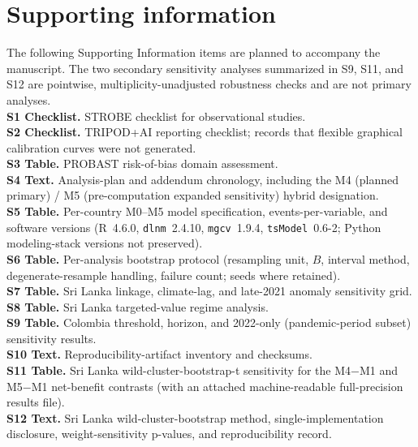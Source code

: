 \documentclass[11pt,a4paper]{article}
\begin{document}
\clearpage
\section*{Supporting information}
\begingroup{}
\noindent The following Supporting Information items are planned to accompany the manuscript. The two secondary sensitivity analyses summarized in S9, S11, and S12 are pointwise, multiplicity-unadjusted robustness checks and are not primary analyses.\\[0.4em]
\noindent\textbf{S1 Checklist.} STROBE checklist for observational studies.\\
\textbf{S2 Checklist.} TRIPOD+AI reporting checklist; records that flexible graphical calibration curves were not generated.\\
\textbf{S3 Table.} PROBAST risk-of-bias domain assessment.\\
\textbf{S4 Text.} Analysis-plan and addendum chronology, including the M4 (planned primary) / M5 (pre-computation expanded sensitivity) hybrid designation.\\
\textbf{S5 Table.} Per-country M0--M5 model specification, events-per-variable, and software versions (R~4.6.0, \texttt{dlnm}~2.4.10, \texttt{mgcv}~1.9.4, \texttt{tsModel}~0.6-2; Python modeling-stack versions not preserved).\\
\textbf{S6 Table.} Per-analysis bootstrap protocol (resampling unit, $B$, interval method, degenerate-resample handling, failure count; seeds where retained).\\
\textbf{S7 Table.} Sri Lanka linkage, climate-lag, and late-2021 anomaly sensitivity grid.\\
\textbf{S8 Table.} Sri Lanka targeted-value regime analysis.\\
\textbf{S9 Table.} Colombia threshold, horizon, and 2022-only (pandemic-period subset) sensitivity results.\\
\textbf{S10 Text.} Reproducibility-artifact inventory and checksums.\\
\textbf{S11 Table.} Sri Lanka wild-cluster-bootstrap-t sensitivity for the M4$-$M1 and M5$-$M1 net-benefit contrasts (with an attached machine-readable full-precision results file).\\
\textbf{S12 Text.} Sri Lanka wild-cluster-bootstrap method, single-implementation disclosure, weight-sensitivity p-values, and reproducibility record.
\endgroup
\end{document}
